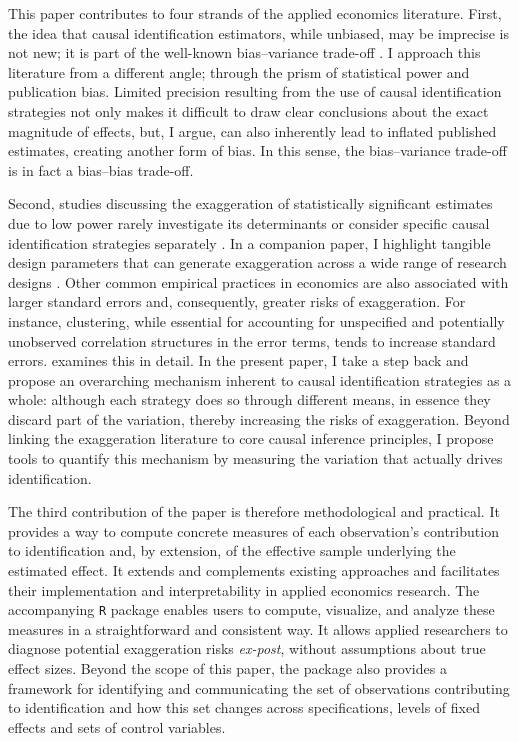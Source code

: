 			This paper contributes to four strands of the applied economics literature. First, the idea that causal identification estimators, while unbiased, may be imprecise is not new; it is part of the well-known bias–variance trade-off \citep{imbens_optimal_2012, deaton_understanding_2018, hernan_causal_2020, ravallion_should_2020a}. I approach this literature from a different angle; through the prism of statistical power and publication bias. Limited precision resulting from the use of causal identification strategies not only makes it difficult to draw clear conclusions about the exact magnitude of effects, but, I argue, can also inherently lead to inflated published estimates, creating another form of bias. In this sense, the bias–variance trade-off is in fact a bias–bias trade-off.
			
			Second, studies discussing the exaggeration of statistically significant estimates due to low power rarely investigate its determinants or consider specific causal identification strategies separately \citep{ioannidis_power_2017, schellEvaluatingMethodsEstimate2018, ferraro_featureis_2020, black_simulated_2022, stommesReliability2023, arel-bundock_quantitative_2024}. In a companion paper, I highlight tangible design parameters that can generate exaggeration across a wide range of research designs \citep{bagilet_accurate_2023}. Other common empirical practices in economics are also associated with larger standard errors and, consequently, greater risks of exaggeration. For instance, clustering, while essential for accounting for unspecified and potentially unobserved correlation structures in the error terms, tends to increase standard errors. \citet{vu_standard_2025} examines this in detail. In the present paper, I take a step back and propose an overarching mechanism inherent to causal identification strategies as a whole: although each strategy does so through different means, in essence they discard part of the variation, thereby increasing the risks of exaggeration. Beyond linking the exaggeration literature to core causal inference principles, I propose tools to quantify this mechanism by measuring the variation that actually drives identification.
			
			The third contribution of the paper is therefore methodological and practical. It provides a way to compute concrete measures of each observation’s contribution to identification and, by extension, of the effective sample underlying the estimated effect. It extends and complements existing approaches \citep{angrist_mostly_2009, aronow_does_2016} and facilitates their implementation and interpretability in applied economics research. The accompanying \verb?R? package enables users to compute, visualize, and analyze these measures in a straightforward and consistent way. It allows applied researchers to diagnose potential exaggeration risks \textit{ex-post}, without assumptions about true effect sizes. Beyond the scope of this paper, the package also provides a framework for identifying and communicating the set of observations contributing to identification and how this set changes across specifications, levels of fixed effects and sets of control variables.
			

